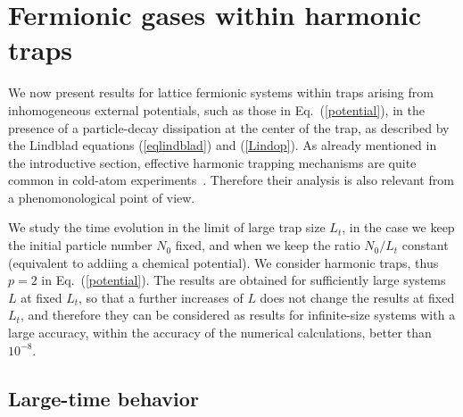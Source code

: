   
  
  \section{Fermionic gases within harmonic traps}
  \label{hartra}
  
  
  We now present results for lattice fermionic systems within traps
  arising from inhomogeneous external potentials, such as those in
  Eq.~(\ref{potential}), in the presence of a particle-decay dissipation
  at the center of the trap, as described by the Lindblad equations
  (\ref{eqlindblad}) and (\ref{Lindop}). As already mentioned in
    the introductive section, effective harmonic trapping mechanisms are
    quite common in cold-atom experiments~\cite{BDZ-08}. Therefore their
    analysis is also relevant from a phenomonological point of view.
  
  We study the time evolution in the limit of large trap size $L_t$, in
  the case we keep the initial particle number $N_0$ fixed, and when we
  keep the ratio $N_0/L_t$ constant (equivalent to addiing a chemical
  potential). We consider harmonic traps, thus $p=2$ in
  Eq.~(\ref{potential}). The results are obtained for sufficiently large
  systems $L$ at fixed $L_t$, so that a further increases of $L$ does
  not change the results at fixed $L_t$, and therefore they can be
  considered as results for infinite-size systems with a large accuracy,
  within the accuracy of the numerical calculations, better than
  $10^{-8}$.
  
  
  \subsection{Large-time behavior}
  \label{asytrap}
  
